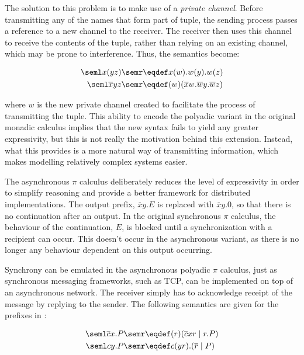The solution to this problem is to make use of a \emph{private
  channel}.  Before transmitting any of the names that form part of
tuple, the sending process passes a reference to a new channel to the
receiver.  The receiver then uses this channel to receive the contents
of the tuple, rather than relying on an existing channel, which may be
prone to interference.  Thus, the semantics become:

\begin{align}
\seml x(yz) \semr & \eqdef x(w).w(y).w(z) \\
\seml \overline{x}yz \semr & \eqdef (w)(\overline{x}w.\overline{w}y.\overline{w}z)
\end{align}

\noindent where $w$ is the new private channel created to facilitate
the process of transmitting the tuple.  This ability to encode the
polyadic variant in the original monadic calculus implies that the new
syntax fails to yield any greater expressivity, but this is not really
the motivation behind this extension.  Instead, what this provides is
a more natural way of transmitting information, which makes modelling
relatively complex systems easier.

The asynchronous $\pi$ calculus \cite{boudol:asynchrony,
  honda:asynchronouscommunication, sangiorgi:asynchronousprocesscalculi}
  deliberately reduces the level of expressivity in order to simplify
  reasoning and provide a better framework for distributed
  implementations.  The output prefix, $\overline{x}y.E$ is replaced
  with $\overline{x}y.0$, so that there is no continuation after an
  output.  In the original synchronous $\pi$ calculus, the behaviour of
  the continuation, $E$, is blocked until a synchronization with a
  recipient can occur.  This doesn't occur in the asynchronous variant,
  as there is no longer any behaviour dependent on this output
  occurring.

Synchrony can be emulated in the asynchronous polyadic $\pi$ calculus,
just as synchronous messaging frameworks, such as TCP, can be
implemented on top of an asynchronous network.  The receiver simply
has to acknowledge receipt of the message by replying to the sender.
The following semantics are given for the prefixes in \cite{boxedamb01}:

\begin{align}
\seml \overline{c}x.P \semr & \eqdef (r)(\overline{c}xr\;|\;r.P) \\
\seml cy.P \semr & \eqdef c(yr).(\overline{r}\;|\;P)
\end{align}

